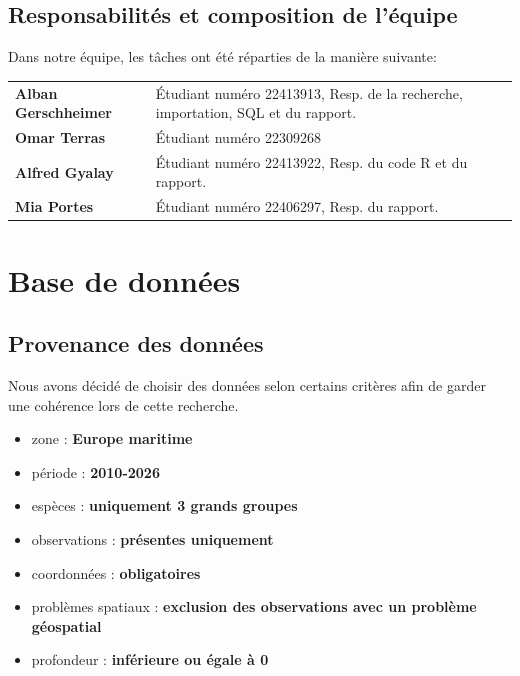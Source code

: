 \documentclass[mstat,12pt]{unswthesis}
\begin{document}
\section{Responsabilités et composition de
l'équipe}\label{responsabilituxe9s-et-composition-de-luxe9quipe}

Dans notre équipe, les tâches ont été réparties de la manière suivante:

\medskip

\begin{center}
\begin{tabular}{p{}p{}}
\textbf{Alban Gerschheimer} & Étudiant numéro 22413913, Resp. de la recherche, importation, SQL et du rapport.\\
\textbf{Omar Terras} & Étudiant numéro 22309268\\
\textbf{Alfred Gyalay} & Étudiant numéro 22413922, Resp. du code R et du rapport.\\
\textbf{Mia Portes} & Étudiant numéro 22406297, Resp. du rapport.
\end{tabular}
\end{center}

\chapter{Base de données}\label{base-de-donnuxe9es}

\section{Provenance des données}\label{provenance-des-donnuxe9es}

Nous avons décidé de choisir des données selon certains critères afin de
garder une cohérence lors de cette recherche.

\begin{itemize}
\item zone : \textbf{Europe maritime}
\item période : \textbf{2010-2026}
\item espèces : \textbf{uniquement 3 grands groupes}
\item observations : \textbf{présentes uniquement}
\item coordonnées : \textbf{obligatoires}
\item problèmes spatiaux : \textbf{exclusion des observations avec un problème géospatial}
\item profondeur : \textbf{inférieure ou égale à 0}
\end{itemize}
\end{document}
